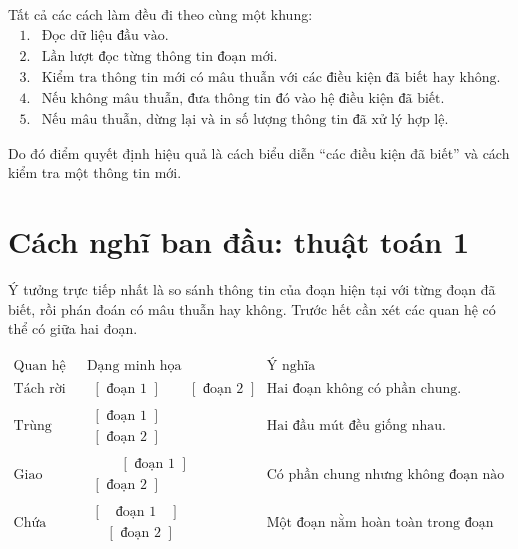 \documentclass[11pt]{article}
\begin{document}
Tất cả các cách làm đều đi theo cùng một khung:
\[
\begin{array}{ll}
1. & \text{Đọc dữ liệu đầu vào.}\\
2. & \text{Lần lượt đọc từng thông tin đoạn mới.}\\
3. & \text{Kiểm tra thông tin mới có mâu thuẫn với các điều kiện đã biết
        hay không.}\\
4. & \text{Nếu không mâu thuẫn, đưa thông tin đó vào hệ điều kiện đã biết.}\\
5. & \text{Nếu mâu thuẫn, dừng lại và in số lượng thông tin đã xử lý hợp lệ.}
\end{array}
\]

Do đó điểm quyết định hiệu quả là cách biểu diễn ``các điều kiện đã biết''
và cách kiểm tra một thông tin mới.

\section{Cách nghĩ ban đầu: thuật toán 1}

Ý tưởng trực tiếp nhất là so sánh thông tin của đoạn hiện tại với từng đoạn đã
biết, rồi phán đoán có mâu thuẫn hay không. Trước hết cần xét các quan hệ có
thể có giữa hai đoạn.

\[
\begin{array}{c|c|l}
\text{Quan hệ} & \text{Dạng minh họa} & \text{Ý nghĩa}\\ \hline
\text{Tách rời} &
\begin{array}{c}
[\,\,\text{đoạn 1}\,\,]\qquad[\,\,\text{đoạn 2}\,\,]
\end{array}
& \text{Hai đoạn không có phần chung.}\\[0.8em]
\text{Trùng nhau} &
\begin{array}{c}
[\,\,\text{đoạn 1}\,\,]\\[-0.2em]
[\,\,\text{đoạn 2}\,\,]
\end{array}
& \text{Hai đầu mút đều giống nhau.}\\[1.0em]
\text{Giao nhau} &
\begin{array}{c}
\qquad[\,\,\text{đoạn 1}\,\,]\\[-0.2em]
[\,\,\text{đoạn 2}\,\,]\qquad
\end{array}
& \text{Có phần chung nhưng không đoạn nào chứa đoạn kia.}\\[1.0em]
\text{Chứa nhau} &
\begin{array}{c}
[\,\,\,\,\,\,\text{đoạn 1}\,\,\,\,\,\,]\\[-0.2em]
\quad[\,\,\text{đoạn 2}\,\,]\quad
\end{array}
& \text{Một đoạn nằm hoàn toàn trong đoạn kia.}
\end{array}
\]
\end{document}

